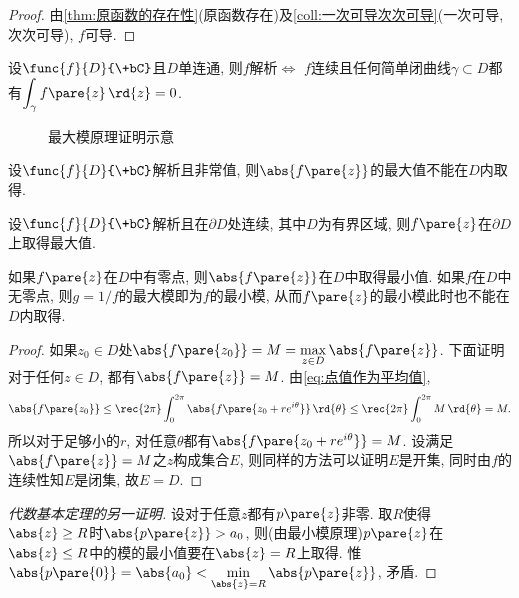\documentclass[../ComplexVariable.tex]{subfiles}
\begin{document}
\begin{proof}
    由\cref{thm:原函数的存在性}(原函数存在)及\cref{coll:一次可导次次可导}(一次可导, 次次可导), $f$可导.
\end{proof}
\begin{corollary}
    设$\func{f}{D}{\+bC}$且$D$单连通, 则$f$解析$\Leftrightarrow$ $f$连续且任何简单闭曲线$\gamma\subset D$都有$\displaystyle \int_\gamma f\pare{z}\,\rd{z} = 0$.
\end{corollary}
\begin{figure}[ht]
    \centering
    \caption{最大模原理证明示意}
\end{figure}
\begin{theorem}[最大模原理]
    设$\func{f}{D}{\+bC}$解析且非常值, 则$\abs{f\pare{z}}$的最大值不能在$D$内取得.
\end{theorem}
\begin{corollary}
    设$\func{f}{D}{\+bC}$解析且在$\partial D$处连续, 其中$D$为有界区域, 则$f\pare{z}$在$\partial D$上取得最大值.
\end{corollary}
\begin{remark}
    如果$f\pare{z}$在$D$中有零点, 则$\abs{f\pare{z}}$在$D$中取得最小值. 如果$f$在$D$中无零点, 则$g=1/f$的最大模即为$f$的最小模, 从而$f\pare{z}$的最小模此时也不能在$D$内取得.
\end{remark}
\begin{proof}
    如果$z_0\in D$处$\abs{f\pare{z_0}}=M = \displaystyle \max_{z\in D} \abs{f\pare{z}}$. 下面证明对于任何$z\in D$, 都有$\abs{f\pare{z}} = M$. 由\eqref{eq:点值作为平均值},
    \[ \abs{f\pare{z_0}} \le \rec{2\pi}\int_0^{2\pi} \abs{f\pare{z_0+re^{i\theta}}}\,\rd{\theta} \le \rec{2\pi}\int_0^{2\pi} M\,\rd{\theta} = M. \]
    所以对于足够小的$r$, 对任意$\theta$都有$\abs{f\pare{z_0 + re^{i\theta}}} = M$. 设满足$\abs{f\pare{z}}=M$之$z$构成集合$E$, 则同样的方法可以证明$E$是开集, 同时由$f$的连续性知$E$是闭集, 故$E=D$.
\end{proof}
\begin{proof}[代数基本定理的另一证明]
    设对于任意$z$都有$p\pare{z}$非零. 取$R$使得$\abs{z}\ge R$时$\abs{p\pare{z}}>a_0$, 则(由最小模原理)$p\pare{z}$在$\abs{z} \le R$中的模的最小值要在$\abs{z} = R$上取得. 惟$\abs{p\pare{0}} = \abs{a_0}<\displaystyle \min_{\abs{z}=R}\abs{p\pare{z}}$, 矛盾.
\end{proof}


\end{document}
